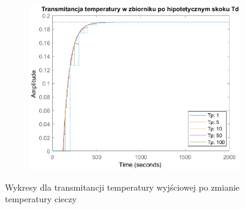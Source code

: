 \begin{figure}[h!]
   \begin{subfigure}[b]{0.6\textwidth}
      \includegraphics[width=1\linewidth]{img/transforms/transformTTd.eps}
      \caption{}
      \label{fig:fig:transformTT3}
   \end{subfigure}
       
   \caption{Wykresy dla transmitancji temperatury wyjściowej po zmianie temperatury cieczy}
   \label{fig:transformTT}
\end{figure}
           
